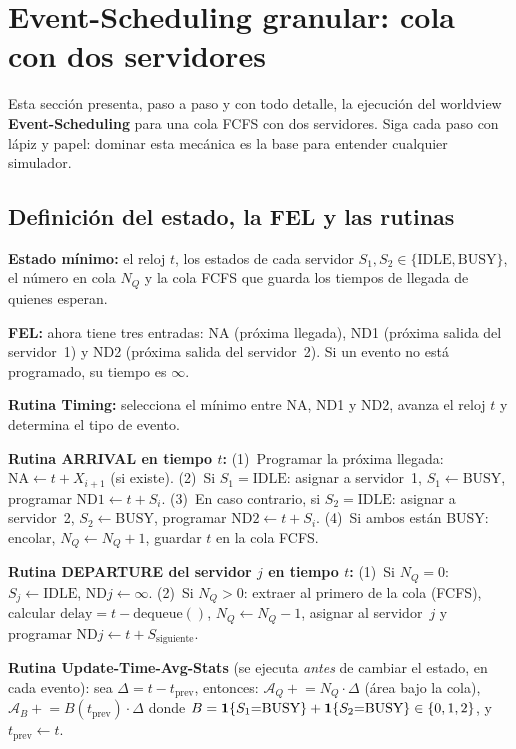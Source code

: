 \documentclass[11pt, letterpaper]{article}
\begin{document}
\section{Event-Scheduling granular: cola con dos servidores}

Esta sección presenta, paso a paso y con todo detalle, la ejecución del worldview \textbf{Event-Scheduling} para una cola FCFS con dos servidores. Siga cada paso con lápiz y papel: dominar esta mecánica es la base para entender cualquier simulador.

\subsection{Definición del estado, la FEL y las rutinas}

\textbf{Estado mínimo:} el reloj $t$, los estados de cada servidor $S_1, S_2 \in \{\text{IDLE}, \text{BUSY}\}$, el número en cola $N_Q$ y la cola FCFS que guarda los tiempos de llegada de quienes esperan.

\textbf{FEL:} ahora tiene tres entradas: NA (próxima llegada), ND1 (próxima salida del servidor~1) y ND2 (próxima salida del servidor~2). Si un evento no está programado, su tiempo es $\infty$.

\textbf{Rutina Timing:} selecciona el mínimo entre NA, ND1 y ND2, avanza el reloj $t$ y determina el tipo de evento.

\textbf{Rutina ARRIVAL en tiempo $t$:} (1)~Programar la próxima llegada: $\text{NA} \leftarrow t + X_{i+1}$ (si existe). (2)~Si $S_1 = \text{IDLE}$: asignar a servidor~1, $S_1 \leftarrow \text{BUSY}$, programar $\text{ND1} \leftarrow t + S_i$. (3)~En caso contrario, si $S_2 = \text{IDLE}$: asignar a servidor~2, $S_2 \leftarrow \text{BUSY}$, programar $\text{ND2} \leftarrow t + S_i$. (4)~Si ambos están BUSY: encolar, $N_Q \leftarrow N_Q + 1$, guardar $t$ en la cola FCFS.

\textbf{Rutina DEPARTURE del servidor $j$ en tiempo $t$:} (1)~Si $N_Q = 0$: $S_j \leftarrow \text{IDLE}$, $\text{ND}j \leftarrow \infty$. (2)~Si $N_Q > 0$: extraer al primero de la cola (FCFS), calcular $\text{delay} = t - \text{dequeue}()$, $N_Q \leftarrow N_Q - 1$, asignar al servidor~$j$ y programar $\text{ND}j \leftarrow t + S_{\text{siguiente}}$.

\textbf{Rutina Update-Time-Avg-Stats} (se ejecuta \emph{antes} de cambiar el estado, en cada evento): sea $\Delta = t - t_{\text{prev}}$, entonces: $\mathcal{A}_Q \mathrel{+}= N_Q \cdot \Delta$ (área bajo la cola), $\mathcal{A}_B \mathrel{+}= B(t_{\text{prev}}) \cdot \Delta$ donde $B = \mathbf{1}\{S_1\text{=BUSY}\} + \mathbf{1}\{S_2\text{=BUSY}\} \in \{0,1,2\}$, y $t_{\text{prev}} \leftarrow t$.
\end{document}
